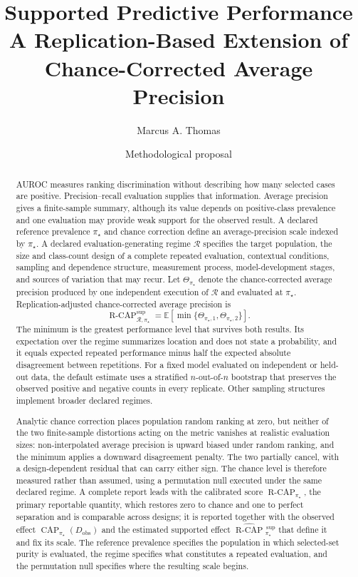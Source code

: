 \documentclass[11pt]{article}
\title{Supported Predictive Performance\\
\large A Replication-Based Extension of Chance-Corrected Average Precision}
\author{Marcus A. Thomas}
\date{Methodological proposal}
\newcommand{\CAP}{\operatorname{CAP}}
\newcommand{\Regime}{\mathcal{R}}
\newcommand{\Tpi}{\CAP_{\pi_\star}}
\newcommand{\E}{\mathbb{E}}
\newcommand{\RCAPfull}{\operatorname{R\text{-}CAP}^{\mathrm{sup}}_{\Regime,\pi_\star}}
\newcommand{\RCAPHat}{\widehat{\operatorname{R\text{-}CAP}}{}^{\,\mathrm{sup}}_{\pi_\star}}
\newcommand{\RCAPcal}{\operatorname{R\text{-}CAP}_{\pi_\star}}
\theoremstyle{remark}
\begin{document}
\maketitle

\begin{abstract}
AUROC measures ranking discrimination without describing how many selected cases are positive. Precision--recall evaluation supplies that information. Average precision gives a finite-sample summary, although its value depends on positive-class prevalence and one evaluation may provide weak support for the observed result. A declared reference prevalence $\pi_\star$ and chance correction define an average-precision scale indexed by $\pi_\star$. A declared evaluation-generating regime $\Regime$ specifies the target population, the size and class-count design of a complete repeated evaluation, contextual conditions, sampling and dependence structure, measurement process, model-development stages, and sources of variation that may recur. Let $\Theta_{\pi_\star}$ denote the chance-corrected average precision produced by one independent execution of $\Regime$ and evaluated at $\pi_\star$. Replication-adjusted chance-corrected average precision is
\[
\RCAPfull
=
\E\!\left[
\min\{\Theta_{\pi_\star,1},\Theta_{\pi_\star,2}\}
\right].
\]
The minimum is the greatest performance level that survives both results. Its expectation over the regime summarizes location and does not state a probability, and it equals expected repeated performance minus half the expected absolute disagreement between repetitions. For a fixed model evaluated on independent or held-out data, the default estimate uses a stratified $n$-out-of-$n$ bootstrap that preserves the observed positive and negative counts in every replicate. Other sampling structures implement broader declared regimes.

Analytic chance correction places population random ranking at zero, but neither of the two finite-sample distortions acting on the metric vanishes at realistic evaluation sizes: non-interpolated average precision is upward biased under random ranking, and the minimum applies a downward disagreement penalty. The two partially cancel, with a design-dependent residual that can carry either sign. The chance level is therefore measured rather than assumed, using a permutation null executed under the same declared regime. A complete report leads with the calibrated score $\RCAPcal$, the primary reportable quantity, which restores zero to chance and one to perfect separation and is comparable across designs; it is reported together with the observed effect $\Tpi(D_{\mathrm{obs}})$ and the estimated supported effect $\RCAPHat$ that define it and fix its scale. The reference prevalence specifies the population in which selected-set purity is evaluated, the regime specifies what constitutes a repeated evaluation, and the permutation null specifies where the resulting scale begins.
\end{abstract}
\end{document}
